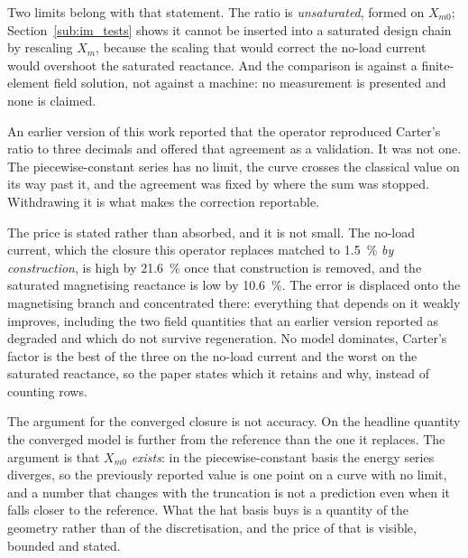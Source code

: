 \documentclass[10pt,a4paper,twocolumn]{article}
\theoremstyle{plain}
\theoremstyle{remark}
\begin{document}
Two limits belong with that statement. The ratio is \emph{unsaturated},
formed on $X_{m0}$; Section~\ref{sub:im_tests} shows it cannot be
inserted into a saturated design chain by rescaling $X_m$, because the
scaling that would correct the no-load current would overshoot the
saturated reactance. And the comparison is against a finite-element
field solution, not against a machine: no measurement is presented and
none is claimed.

An earlier version of this work reported that the operator reproduced
Carter's ratio to three decimals and offered that agreement as a
validation. It was not one. The piecewise-constant series has no limit,
the curve crosses the classical value on its way past it, and the
agreement was fixed by where the sum was stopped. Withdrawing it is what
makes the correction reportable.

The price is stated rather than absorbed, and it is not small. The
no-load current, which the closure this operator replaces matched to
\SI{1.5}{\percent} \emph{by construction}, is high by
\SI{21.6}{\percent} once that construction is removed, and the saturated
magnetising reactance is low by \SI{10.6}{\percent}. The error is
displaced onto the magnetising branch and concentrated there: everything
that depends on it weakly improves, including the two field quantities
that an earlier version reported as degraded and which do not survive
regeneration. No model dominates, Carter's factor is the best of the
three on the no-load current and the worst on the saturated
reactance, so the paper states which it retains and why, instead of
counting rows.

The argument for the converged closure is not accuracy. On the headline
quantity the converged model is further from the reference than the one
it replaces. The argument is that $X_{m0}$ \emph{exists}: in the
piecewise-constant basis the energy series diverges, so the previously
reported value is one point on a curve with no limit, and a number that
changes with the truncation is not a prediction even when it falls
closer to the reference. What the hat basis buys is a quantity of the
geometry rather than of the discretisation, and the price of that is
visible, bounded and stated.
\end{document}

